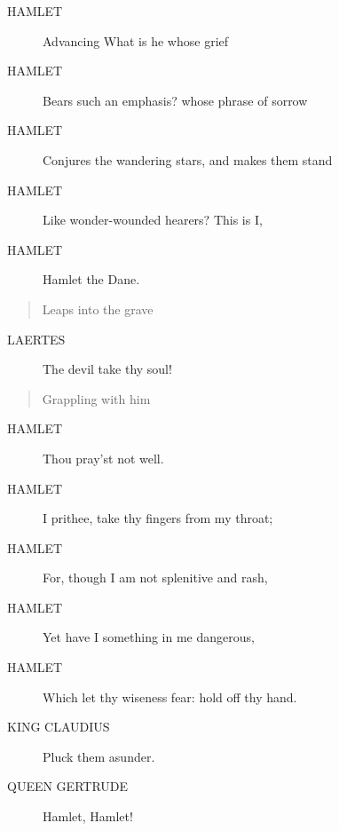 \documentclass{article}
\begin{document}
\begin{description}
            
\item[HAMLET] 
               Advancing     What is he whose grief
\item[HAMLET] Bears such an emphasis? whose phrase of sorrow
\item[HAMLET] Conjures the wandering stars, and makes them stand
\item[HAMLET] Like wonder-wounded hearers? This is I,
\item[HAMLET] Hamlet the Dane.
\end{description}
          
\begin{quote}
Leaps into the grave
\end{quote}
          
\begin{description}
            
\item[LAERTES] The devil take thy soul!
\end{description}
          
\begin{quote}
Grappling with him
\end{quote}
          
\begin{description}
            
\item[HAMLET] Thou pray'st not well.
\item[HAMLET] I prithee, take thy fingers from my throat;
\item[HAMLET] For, though I am not splenitive and rash,
\item[HAMLET] Yet have I something in me dangerous,
\item[HAMLET] Which let thy wiseness fear: hold off thy hand.
\end{description}
          
\begin{description}
            
\item[KING CLAUDIUS] Pluck them asunder.
\end{description}
          
\begin{description}
            
\item[QUEEN GERTRUDE] Hamlet, Hamlet!
\end{description}
          
\end{document}
